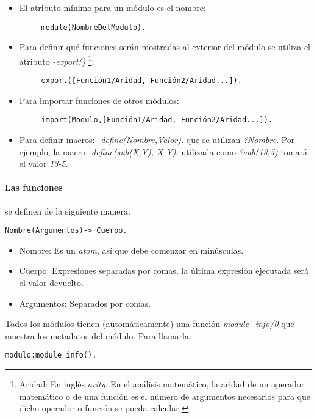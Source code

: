 \begin{itemize}
  \item El atributo mínimo para un módulo es el nombre:
    \begin{verbatim}
    -module(NombreDelModulo).
    \end{verbatim}

  \item Para definir qué funciones serán mostradas al exterior del módulo se utiliza el atributo
    \textit{-export()} \footnote{Aridad: En inglés \textit{arity}. En el análisis
    matemático, la aridad de un operador matemático o de una función es el número de argumentos necesarios
    para que dicho operador o función se pueda calcular.}:
    \begin{verbatim}
    -export([Función1/Aridad, Función2/Aridad...]).
    \end{verbatim}

  \item Para importar funciones de otros módulos:
    \begin{verbatim}
    -import(Modulo,[Función1/Aridad, Función2/Aridad...]).
    \end{verbatim}

  \item Para definir macros: \textit{-define(Nombre,Valor).} que se utilizan \textit{?Nombre}. Por ejemplo,
  la macro \textit{-define(sub(X,Y), X-Y).} utilizada como \textit{?sub(13,5)} tomará el valor \textit{13-5}.
\end{itemize}


\paragraph{Las funciones} se definen de la siguiente manera:
\begin{verbatim}
Nombre(Argumentos)-> Cuerpo.
\end{verbatim}

\begin{itemize}
  \item Nombre: Es un \textit{atom}, así que debe comenzar en minúsculas.
  \item Cuerpo: Expresiones separadas por comas, la última expresión ejecutada será el valor devuelto.
  \item Argumentos: Separados por comas.
\end{itemize}

Todos los módulos tienen (automáticamente) una función \textit{module_info/0} que muestra los metadatos del
módulo. Para llamarla:
\begin{lstlisting}
modulo:module_info().
\end{lstlisting}


